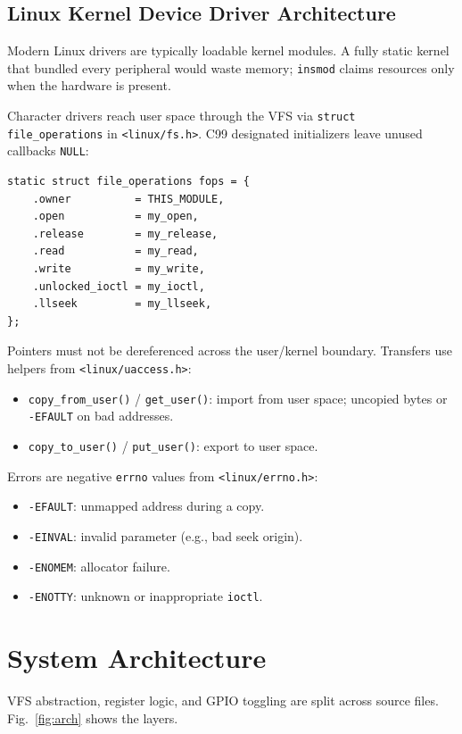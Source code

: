 \documentclass[conference,a4paper]{IEEEtran}
\begin{document}
\subsection{Linux Kernel Device Driver Architecture}

Modern Linux drivers are typically loadable kernel modules. A fully static kernel that bundled every peripheral would waste memory; \texttt{insmod} claims resources only when the hardware is present.

Character drivers reach user space through the VFS via \texttt{struct file\_operations} in \texttt{<linux/fs.h>}. C99 designated initializers leave unused callbacks \texttt{NULL}:
\begin{lstlisting}
static struct file_operations fops = {
    .owner          = THIS_MODULE,
    .open           = my_open,
    .release        = my_release,
    .read           = my_read,
    .write          = my_write,
    .unlocked_ioctl = my_ioctl,
    .llseek         = my_llseek,
};
\end{lstlisting}

Pointers must not be dereferenced across the user/kernel boundary. Transfers use helpers from \texttt{<linux/uaccess.h>}:
\begin{itemize}
    \item \texttt{copy\_from\_user()} / \texttt{get\_user()}: import from user space; uncopied bytes or \texttt{-EFAULT} on bad addresses.
    \item \texttt{copy\_to\_user()} / \texttt{put\_user()}: export to user space.
\end{itemize}

Errors are negative \texttt{errno} values from \texttt{<linux/errno.h>}:
\begin{itemize}
    \item \texttt{-EFAULT}: unmapped address during a copy.
    \item \texttt{-EINVAL}: invalid parameter (e.g., bad seek origin).
    \item \texttt{-ENOMEM}: allocator failure.
    \item \texttt{-ENOTTY}: unknown or inappropriate \texttt{ioctl}.
\end{itemize}

\section{System Architecture}
\label{sec:arch}

VFS abstraction, register logic, and GPIO toggling are split across source files. Fig.~\ref{fig:arch} shows the layers.
\end{document}
